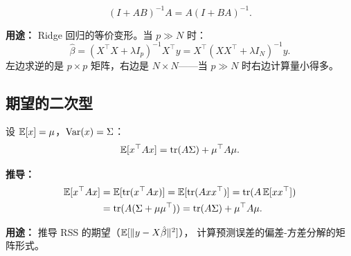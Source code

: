 \begin{equation}\label{eq:push-through}
    (I + AB)^{-1} A = A (I + BA)^{-1}.
\end{equation}

\textbf{用途：} Ridge 回归的等价变形。当 $p \gg N$ 时：
\begin{equation}
    \hat{\beta} = (X^\top X + \lambda I_p)^{-1} X^\top y
    = X^\top (X X^\top + \lambda I_N)^{-1} y.
\end{equation}
左边求逆的是 $p \times p$ 矩阵，右边是 $N \times N$——当 $p \gg N$ 时右边计算量小得多。

\subsection{期望的二次型}

设 $\mathbb{E}[x] = \mu$，$\mathrm{Var}(x) = \Sigma$：
\begin{equation}\label{eq:quadratic-expectation}
    \mathbb{E}[x^\top A x] = \mathrm{tr}(A \Sigma) + \mu^\top A \mu.
\end{equation}

\textbf{推导：}
\begin{align}
    \mathbb{E}[x^\top A x] &= \mathbb{E}[\mathrm{tr}(x^\top A x)]
    = \mathbb{E}[\mathrm{tr}(A x x^\top)]
    = \mathrm{tr}(A \,\mathbb{E}[x x^\top]) \nonumber\\
    &= \mathrm{tr}(A (\Sigma + \mu\mu^\top))
    = \mathrm{tr}(A\Sigma) + \mu^\top A \mu.
\end{align}

\textbf{用途：} 推导 RSS 的期望（$\mathbb{E}[\|y - X\hat{\beta}\|^2]$），
计算预测误差的偏差-方差分解的矩阵形式。

